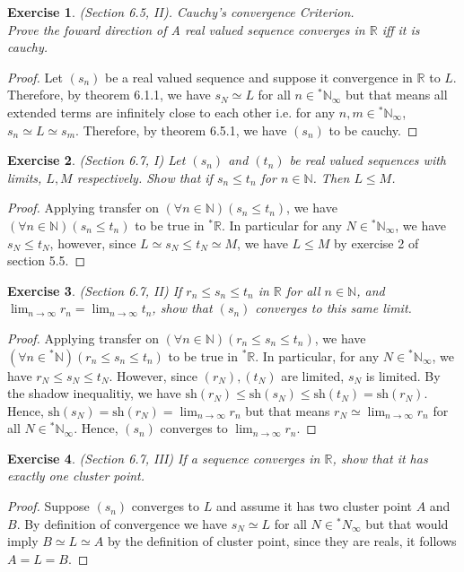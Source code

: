 \documentclass[a4paper, 11pt, openany]{book}
\theoremstyle{plain}
\newtheorem{exercise}{Exercise}[chapter]
\theoremstyle{plain}
\newcommand{\arr}{\rightarrow}
\newcommand{\N}{\mathbb{N}}
\newcommand{\R}{\mathbb{R}}
\newcommand{\hyp}{{}^*}
\newcommand{\sh}{\text{sh}}
\begin{document}
  \begin{exercise}
    (Section 6.5, II). Cauchy's convergence Criterion. \\
    Prove the foward direction of \textit{A real valued sequence converges in $\R$ iff it is cauchy}.
  \end{exercise}
  \begin{proof}
    Let $(s_n)$ be a real valued sequence and suppose it convergence in $\R$ to $L$. Therefore, by theorem 6.1.1, we have $s_N \simeq L$ for all $n \in \hyp \N_\infty$ but that means all extended terms are infinitely close to each other i.e. for any $n,m \in \hyp \N_\infty$, $s_n \simeq L \simeq s_m$. Therefore, by theorem 6.5.1, we have $(s_n)$ to be cauchy.
  \end{proof}

  \begin{exercise}
    (Section 6.7, I)
    Let $(s_n)$ and $(t_n)$ be real valued sequences with limits, $L, M$ respectively. Show that if $s_n \leq t_n$ for $n \in \N$. Then $L \leq M$.
  \end{exercise}
  \begin{proof}
    Applying transfer on $(\forall n \in \N)(s_n \leq t_n)$, we have $(\forall n \in \N)(s_n \leq t_n)$ to be true in $\hyp \R$. In particular for any $N \in \hyp \N_\infty$, we have $s_N \leq t_N$, however, since $L \simeq s_N \leq t_N \simeq M$, we have $L \leq M$ by exercise 2 of section 5.5.
  \end{proof}
  
  \begin{exercise}
    (Section 6.7, II)
    If $r_n \leq s_n \leq t_n$ in $\R$ for all $n \in \N$, and $\lim_{n \arr \infty} r_n=\lim_{n \arr \infty} t_n$, show that $(s_n)$ converges to this same limit.
  \end{exercise}
  \begin{proof}
    Applying transfer on $(\forall n \in \N)(r_n \leq s_n \leq t_n)$, we have $(\forall n \in \hyp \N)(r_n \leq s_n \leq t_n)$ to be true in $\hyp \R$. In particular, for any $N \in \hyp \N_\infty$, we have $r_N \leq s_N \leq t_N$. However, since $(r_N), (t_N)$ are limited, $s_N$ is limited. By the shadow inequalitiy, we have $\sh(r_N) \leq \sh(s_N) \leq \sh(t_N)=\sh(r_N)$. Hence, $\sh(s_N)=\sh(r_N)=\lim_{n \arr \infty} r_n$ but that means $r_N \simeq \lim_{n \arr \infty} r_n$ for all $N \in \hyp \N_\infty$. Hence, $(s_n)$ converges to $\lim_{n \arr \infty} r_n$.
  \end{proof}

  \begin{exercise}
    (Section 6.7, III)
    If a sequence converges in $\R$, show that it has exactly one cluster point.
  \end{exercise}
  \begin{proof}
    Suppose $(s_n)$ converges to $L$ and assume it has two cluster point $A$ and $B$. By definition of convergence we have $s_N \simeq L$ for all $N \in \hyp N_\infty$ but that would imply $B \simeq L \simeq A$ by the definition of cluster point, since they are reals, it follows $A=L=B$. 
  \end{proof}
\end{document}
